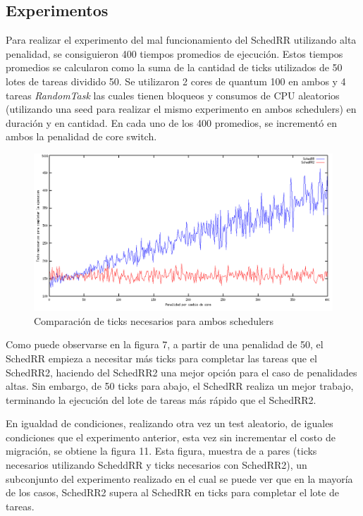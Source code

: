 \documentclass[a4paper,10pt,twoside]{article}
\begin{document}
\subsection{Experimentos}

Para realizar el experimento del mal funcionamiento del SchedRR utilizando alta penalidad, se consiguieron 400 tiempos promedios de ejecución. Estos tiempos promedios se calcularon como la suma de la cantidad de ticks utilizados de 50 lotes de tareas dividido 50. Se utilizaron 2 cores de quantum 100 en ambos y 4 tareas \textit{RandomTask} las cuales tienen bloqueos y consumos de CPU aleatorios (utilizando una seed para realizar el mismo experimento en ambos schedulers) en duración y en cantidad. En cada uno de los 400 promedios, se incrementó en ambos la penalidad de core switch.

\begin{figure}[ht!]
\centering
\includegraphics[width=175mm]{../ejercicio8/compTicksSched.png}
\caption{Comparación de ticks necesarios para ambos schedulers}
\label{overflow}
\end{figure}

Como puede observarse en la figura 7, a partir de una penalidad de 50, el SchedRR empieza a necesitar más ticks para completar las tareas que el SchedRR2, haciendo del SchedRR2 una mejor opción para el caso de penalidades altas. Sin embargo, de 50 ticks para abajo, el SchedRR realiza un mejor trabajo, terminando la ejecución del lote de tareas más rápido que el SchedRR2.

En igualdad de condiciones, realizando otra vez un test aleatorio, de iguales condiciones que el experimento anterior, esta vez sin incrementar el costo de migración, se obtiene la figura 11. Esta figura, muestra de a pares (ticks necesarios utilizando ScheddRR y ticks necesarios con SchedRR2), un subconjunto del experimento realizado en el cual se puede ver que en la mayoría de los casos, SchedRR2 supera al SchedRR en ticks para completar el lote de tareas.
\end{document}
